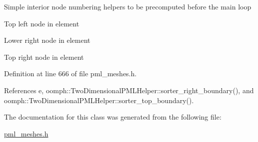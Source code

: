 Simple interior node numbering helpers to be precomputed before the main loop

Top left node in element

Lower right node in element

Top right node in element 

Definition at line 666 of file pml\+\_\+meshes.\+h.



References e, oomph\+::\+Two\+Dimensional\+P\+M\+L\+Helper\+::sorter\+\_\+right\+\_\+boundary(), and oomph\+::\+Two\+Dimensional\+P\+M\+L\+Helper\+::sorter\+\_\+top\+\_\+boundary().



The documentation for this class was generated from the following file\+:\begin{DoxyCompactItemize}
\item 
\hyperlink{pml__meshes_8h}{pml\+\_\+meshes.\+h}\end{DoxyCompactItemize}
